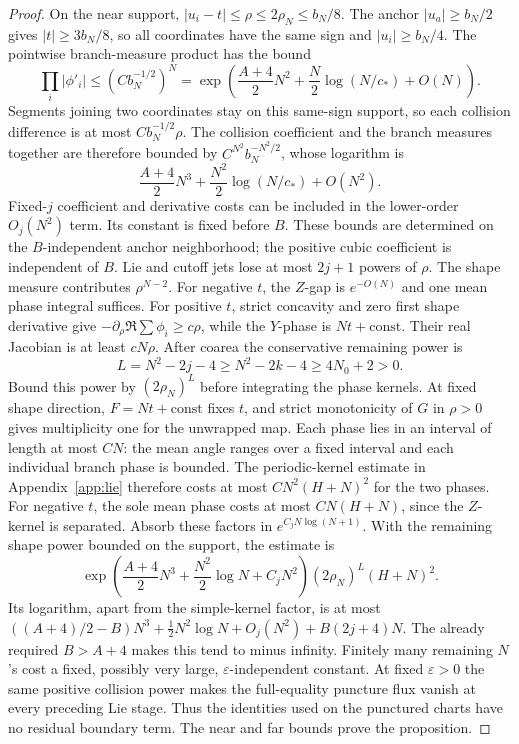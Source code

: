 \documentclass[11pt]{article}
\numberwithin{equation}{section}
\theoremstyle{definition}
\newcommand{\eps}{\varepsilon}
\begin{document}
\begin{proof}
On the near support, \(|u_i-t|\le\rho\le2\rho_N\le b_N/8\).
The anchor \(|u_a|\ge b_N/2\) gives \(|t|\ge3b_N/8\), so
all coordinates have the same sign and \(|u_i|\ge b_N/4\).
The pointwise branch-measure product has the bound
\[
 \prod_i|\phi'_i|\le(Cb_N^{-1/2})^N
 =\exp\left(\frac{A+4}{2}N^2+
             \frac N2\log(N/c_*)+O(N)\right).
\]
Segments joining two coordinates stay on this same-sign support,
so each collision difference is at most \(Cb_N^{-1/2}\rho\).
The collision coefficient and the branch measures together are
therefore bounded by \(C^{N^2}b_N^{-N^2/2}\), whose logarithm is
\[
 \frac{A+4}{2}N^3+\frac{N^2}{2}\log(N/c_*)+O(N^2).
\]
Fixed-\(j\) coefficient and derivative costs can be included in
the lower-order \(O_j(N^2)\) term. Its constant is fixed before
\(B\). These bounds are determined
on the \(B\)-independent anchor neighborhood; the positive cubic
coefficient is independent of \(B\). Lie and cutoff jets lose at most
\(2j+1\) powers of \(\rho\).
The shape measure contributes \(\rho^{N-2}\).
For negative \(t\), the \(Z\)-gap is \(e^{-O(N)}\) and one mean
phase integral suffices.
For positive \(t\), strict concavity and zero first shape derivative
give \(-\partial_\rho\Re\sum\phi_i\ge c\rho\), while the \(Y\)-phase
is \(Nt+\mathrm{const}\). Their real Jacobian is at least \(cN\rho\).
After coarea the conservative remaining power is
\[
 L=N^2-2j-4\ge N^2-2k-4\ge4N_0+2>0.
\]
Bound this power by \((2\rho_N)^L\) before integrating the phase
kernels. At fixed shape direction, \(F=Nt+\mathrm{const}\) fixes
\(t\), and strict monotonicity of \(G\) in \(\rho>0\) gives
multiplicity one for the unwrapped map. Each phase lies in an
interval of length at most \(CN\): the mean angle ranges over a
fixed interval and each individual branch phase is bounded.
The periodic-kernel estimate in Appendix~\ref{app:lie} therefore
costs at most \(CN^2(H+N)^2\) for the two phases. For negative \(t\),
the sole mean phase costs at most \(CN(H+N)\), since the \(Z\)-kernel
is separated. Absorb these factors in \(e^{C_jN\log(N+1)}\). With the
remaining shape power bounded on the support, the estimate is
\[
 \exp\left(\frac{A+4}{2}N^3+\frac{N^2}{2}\log N+C_jN^2\right)
 (2\rho_N)^L(H+N)^2.
\]
Its logarithm, apart from the simple-kernel factor, is at most
\(((A+4)/2-B)N^3+\tfrac12N^2\log N+O_j(N^2)+B(2j+4)N\).
The already required \(B>A+4\) makes this tend to minus infinity.
Finitely many remaining \(N\)'s cost a fixed, possibly very large,
\(\eps\)-independent constant.
At fixed \(\eps>0\) the same positive collision power makes the
full-equality puncture flux vanish at every preceding Lie stage.
Thus the identities used on the punctured charts have no residual
boundary term. The near and far bounds prove the proposition.
\end{proof}
\end{document}
